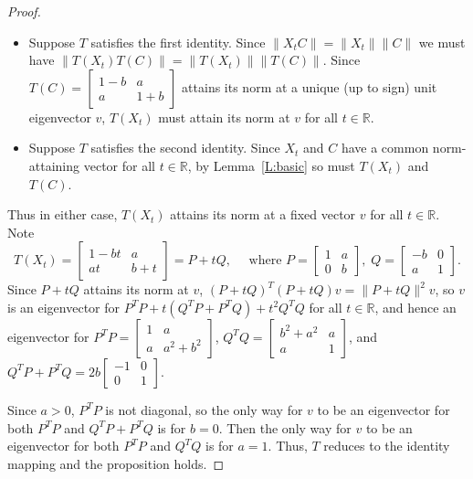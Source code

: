 \documentclass[11pt]{article}
\numberwithin{equation}{section}
\def\IR{{\mathbb R}}
\begin{document}
\begin{proof}
	\begin{itemize}
		\item Suppose  $T$ satisfies the first identity.  Since $\|X_t C\| = \|X_t\| \|C\|$ we  must have  $\|T(X_t) T(C)\| = \|T(X_t)\| \|T(C)\|$.  Since $T(C) = \begin{bmatrix} 1-b & a \\ a & 1+b \end{bmatrix}$ attains its norm at a unique (up to sign) unit eigenvector $v$, $T(X_t)$ must attain its norm at $v$ for all $t \in \IR$.
		\item Suppose $T$ satisfies the second identity.
		Since $X_t$ and $C$ have a common norm-attaining vector for all $t \in \IR$, by Lemma~\ref{L:basic} so must $T(X_t)$ and $T(C)$.
	\end{itemize}

	Thus in either case, $T(X_t)$ attains its norm at a fixed vector $v$ for all $t \in \IR$.  Note
	$$T(X_t) = \begin{bmatrix} 1-bt & a \\ at & b+t \end{bmatrix} = P + tQ, \quad \text{ where } P = \begin{bmatrix} 1 & a \\ 0 & b \end{bmatrix}, \; Q = \begin{bmatrix} -b & 0 \\ a & 1 \end{bmatrix}.$$
	Since $P+tQ$ attains its norm at $v$, $(P+tQ)^T (P+tQ) v = \|P+tQ\|^2 v$, so $v$ is an eigenvector for $P^T P + t(Q^T P + P^TQ) + t^2 Q^T Q$ for all $t \in \IR$, and hence an eigenvector for
	$P^T P = \begin{bmatrix} 1 & a \\ a & a^2 + b^2 \end{bmatrix}$, $Q^T Q = \begin{bmatrix} b^2 + a^2 & a \\ a & 1 \end{bmatrix}$, and $Q^T P + P^T Q = 2b \begin{bmatrix} -1 & 0 \\ 0 & 1 \end{bmatrix}$.

	Since $a>0$, $P^T P$ is not diagonal, so the only way for $v$ to be an eigenvector for both $P^T P$ and $Q^T P + P^T Q$ is for $b=0$.  Then the only way for $v$ to be an eigenvector for both $P^T P$ and $Q^T Q$ is for $a=1$.
	Thus, $T$ reduces to the identity mapping and the proposition
	holds.
\end{proof}
\end{document}

